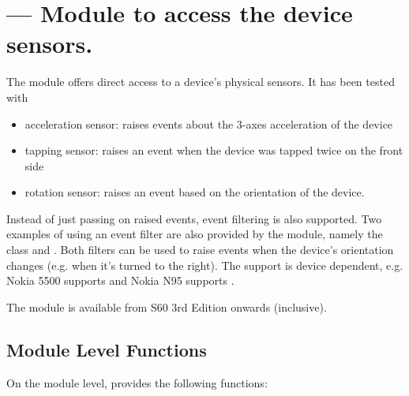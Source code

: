 %
%
%

\section{ ---
  Module to access the device sensors.}
\label{sec:sensor}


The  module offers direct access to a device's physical sensors. It has been tested
with
\begin{itemize}
\item acceleration sensor: raises events about the 3-axes acceleration of the device
\item tapping sensor: raises an event when the device was tapped twice on the front side
\item rotation sensor: raises an event based on the orientation of the device.
\end{itemize}

Instead of just passing on raised events, event filtering is also supported. Two 
examples of using an event filter are also provided by the  
module, namely the class  and 
. Both filters can be used to raise events when the 
device's orientation changes (e.g. when it's turned to the right). The support 
is device dependent, e.g. Nokia 5500 supports  and 
Nokia N95 supports .

\begin{notice}[note]
The module  is available from S60 3rd Edition onwards 
(inclusive).
\end{notice}

\subsection{Module Level Functions}
\label{subsec:sensormodule}
On the module level,  provides the following functions:

